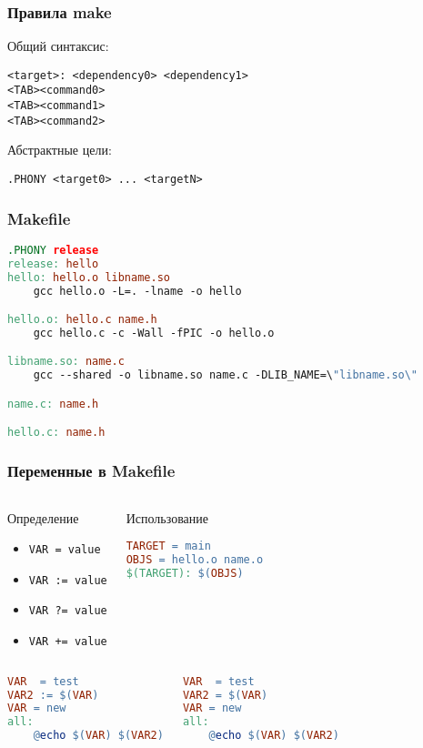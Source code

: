\begin{frame}[fragile]
	\frametitle{Правила make}

	Общий синтаксис:
	\begin{verbatim}
<target>: <dependency0> <dependency1>
<TAB><command0>
<TAB><command1>
<TAB><command2>
	\end{verbatim}

	Абстрактные цели:
	\begin{verbatim}
.PHONY <target0> ... <targetN>
	\end{verbatim}
\end{frame}

\begin{frame}[fragile]
	\frametitle{Makefile}

	\begin{lstlisting}[language=make]
.PHONY release
release: hello
hello: hello.o libname.so
    gcc hello.o -L=. -lname -o hello

hello.o: hello.c name.h
    gcc hello.c -c -Wall -fPIC -o hello.o

libname.so: name.c
    gcc --shared -o libname.so name.c -DLIB_NAME=\"libname.so\"

name.c: name.h

hello.c: name.h
	\end{lstlisting}
\end{frame}

\begin{frame}[fragile]
    \frametitle{Переменные в Makefile}
    \begin{columns}
    \begin{block}{Определение}
    \begin{itemize}
	\item {\tt VAR = value}
	\item {\tt VAR := value}
	\item {\tt VAR ?= value}
	\item {\tt VAR += value}
    \end{itemize}
    \end{block}

    \begin{block}{Использование}
	\begin{lstlisting}[language=make]
TARGET = main
OBJS = hello.o name.o
$(TARGET): $(OBJS)
	\end{lstlisting}
    \end{block}
    \end{columns}

    \pause
    \begin{columns}
	\begin{lstlisting}[language=make]
VAR  = test
VAR2 := $(VAR)
VAR = new
all:
	@echo $(VAR) $(VAR2)
	\end{lstlisting}

	\begin{lstlisting}[language=make]
VAR  = test
VAR2 = $(VAR)
VAR = new
all:
	@echo $(VAR) $(VAR2)
	\end{lstlisting}
    \end{columns}
    
\end{frame}

